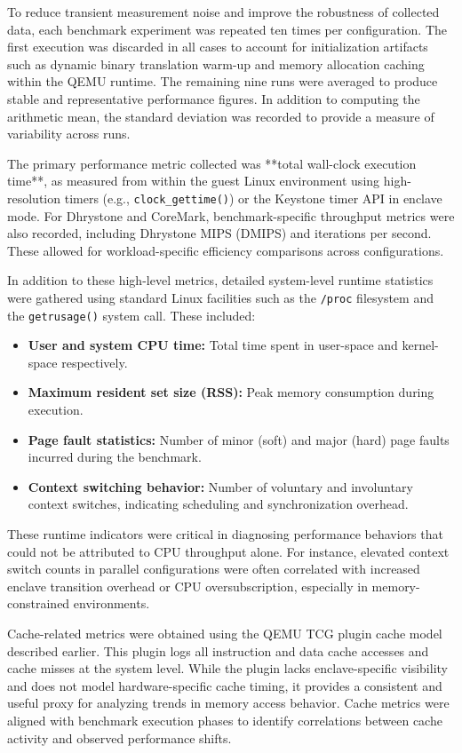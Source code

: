 To reduce transient measurement noise and improve the robustness of collected data, each benchmark experiment was repeated ten times per configuration. The first execution was discarded in all cases to account for initialization artifacts such as dynamic binary translation warm-up and memory allocation caching within the QEMU runtime. The remaining nine runs were averaged to produce stable and representative performance figures. In addition to computing the arithmetic mean, the standard deviation was recorded to provide a measure of variability across runs.

The primary performance metric collected was **total wall-clock execution time**, as measured from within the guest Linux environment using high-resolution timers (e.g., \texttt{clock\_gettime()}) or the Keystone timer API in enclave mode. For Dhrystone and CoreMark, benchmark-specific throughput metrics were also recorded, including Dhrystone MIPS (DMIPS) and iterations per second. These allowed for workload-specific efficiency comparisons across configurations.

In addition to these high-level metrics, detailed system-level runtime statistics were gathered using standard Linux facilities such as the \texttt{/proc} filesystem and the \texttt{getrusage()} system call. These included:

\begin{itemize}
    \item \textbf{User and system CPU time:} Total time spent in user-space and kernel-space respectively.
    \item \textbf{Maximum resident set size (RSS):} Peak memory consumption during execution.
    \item \textbf{Page fault statistics:} Number of minor (soft) and major (hard) page faults incurred during the benchmark.
    \item \textbf{Context switching behavior:} Number of voluntary and involuntary context switches, indicating scheduling and synchronization overhead.
\end{itemize}

These runtime indicators were critical in diagnosing performance behaviors that could not be attributed to CPU throughput alone. For instance, elevated context switch counts in parallel configurations were often correlated with increased enclave transition overhead or CPU oversubscription, especially in memory-constrained environments.

Cache-related metrics were obtained using the QEMU TCG plugin cache model described earlier. This plugin logs all instruction and data cache accesses and cache misses at the system level. While the plugin lacks enclave-specific visibility and does not model hardware-specific cache timing, it provides a consistent and useful proxy for analyzing trends in memory access behavior. Cache metrics were aligned with benchmark execution phases to identify correlations between cache activity and observed performance shifts.

